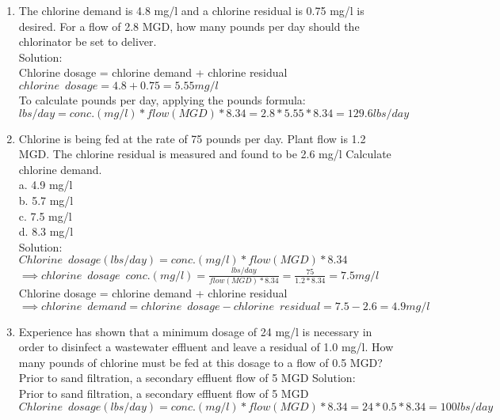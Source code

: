 \begin{enumerate}
\item The chlorine demand is 4.8 mg/l and a chlorine residual is 0.75 mg/l is desired. For a flow of 2.8 MGD, how many pounds per day should the chlorinator be set to deliver.\\
Solution:\\
Chlorine dosage = chlorine demand + chlorine residual\\
\vspace{0.25cm}
$chlorine \enspace dosage=4.8+0.75=5.55mg/l$\\
\vspace{0.25cm}
To calculate pounds per day, applying the pounds formula:\\ 
\vspace{0.25cm}
$lbs/day=conc. (mg/l)*flow(MGD)*8.34=2.8*5.55*8.34=\boxed{129.6lbs/day}$\\
\vspace{0.25cm}
\item Chlorine is being fed at the rate of 75 pounds per day. Plant flow is 1.2 MGD. The chlorine residual is measured and found to be 2.6 mg/l Calculate chlorine demand.\\
a. 4.9 mg/l \\
b. 5.7 mg/l \\
c. 7.5 mg/l \\
d. 8.3 mg/l \\
\vspace{0.25cm}
Solution:\\
$Chlorine \enspace dosage (lbs/day)=conc. (mg/l)*flow(MGD)*8.34$\\
$\implies chlorine \enspace dosage \enspace conc. (mg/l)=\frac{lbs/day}{flow(MGD)*8.34}=\frac{75}{1.2*8.34}=7.5mg/l$\\
Chlorine dosage = chlorine demand + chlorine residual\\
\vspace{0.25cm}
$ \implies chlorine \enspace demand = chlorine \enspace dosage - chlorine \enspace residual=7.5-2.6=\boxed{4.9mg/l}$
\vspace{0.25cm}
\item Experience has shown that a minimum dosage of 24 mg/l is necessary in order to disinfect a wastewater effluent and leave a residual of 1.0 mg/l. How many pounds of chlorine must be fed at this dosage to a flow of 0.5 MGD?\\
Prior to sand filtration, a secondary effluent flow of 5 MGD
Solution:\\
Prior to sand filtration, a secondary effluent flow of 5 MGD
$Chlorine \enspace dosage (lbs/day)=conc. (mg/l)*flow(MGD)*8.34=24*0.5*8.34=\boxed{100lbs/day}$\\

\end{enumerate}
